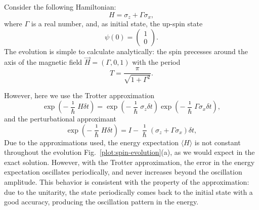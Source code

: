 Consider the following Hamiltonian:
\begin{equation}
H = \sigma_z + \Gamma \sigma_x,
\end{equation}
where $\Gamma$ is a real number, and, as initial state, the up-spin state
\begin{equation}
\psi(0) = 
\begin{pmatrix}
1 \\ 0
\end{pmatrix}.
\end{equation}
The evolution is simple to calculate analytically: the spin precesses around the axis of the magnetic field $\vec{H} = (\Gamma, 0, 1)$ with the period
\begin{equation}
T = \frac{\pi}{\sqrt{1+\Gamma^2}}.
\end{equation}

However, here we use the Trotter approximation
\begin{equation} \label{eq:trotter-approximant}
\exp\left({-\frac{\imath}{\hbar}H \delta t}\right) = \exp\left({-\frac{\imath}{\hbar} \sigma_z \delta t}\right) \exp\left({-\frac{\imath}{\hbar} \Gamma \sigma_x \delta t}\right),
\end{equation}
and the perturbational approximant
\begin{equation} \label{eq:perturbational-approximant}
\exp\left({-\frac{\imath}{\hbar}H \delta t}\right) = I - \frac{\imath}{\hbar}(\sigma_z + \Gamma\sigma_x) \delta t,
\end{equation}
Due to the approximations used, the energy expectation $\langle H \rangle$ is not constant throughout the evolution Fig.~\ref{plot:spin-evolution}(a), as we would expect in the exact solution. However, with the Trotter approximation, the error in the energy expectation oscillates periodically, and never increases beyond the oscillation amplitude. This behavior is consistent with the property of the approximation: due to the unitarity, the state periodically comes back to the initial state with a good accuracy, producing the oscillation pattern in the energy.


